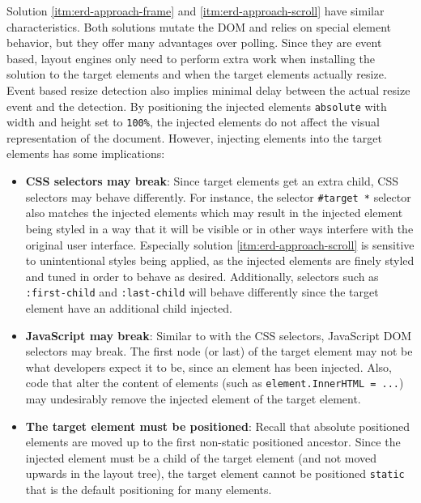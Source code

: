 \documentclass[a4paper,11pt]{kth-mag}
\newcommand{\code}[1]{\texttt{#1}}
\begin{document}
        Solution \ref{itm:erd-approach-frame} and \ref{itm:erd-approach-scroll} have similar characteristics.
        Both solutions mutate the \gls{DOM} and relies on special \gls{element} behavior, but they offer many advantages over polling.
        Since they are event based, layout engines only need to perform extra work when installing the solution to the target \glspl{element} and when the target \glspl{element} actually resize.
        Event based resize detection also implies minimal delay between the actual resize event and the detection.
        By positioning the injected elements \code{absolute} with width and height set to \code{100\%}, the injected \glspl{element} do not affect the visual representation of the \gls{document}.
        However, injecting elements into the target \glspl{element} has some implications:
        \begin{itemize}
          \item \textbf{\gls{CSS} selectors may break}:
            Since target \glspl{element} get an extra child, \gls{CSS} selectors may behave differently.
            For instance, the selector \code{\#target *} selector also matches the injected \glspl{element} which may result in the injected element being styled in a way that it will be visible or in other ways interfere with the original user interface.
            Especially solution \ref{itm:erd-approach-scroll} is sensitive to unintentional styles being applied, as the injected elements are finely styled and tuned in order to behave as desired.
            Additionally, selectors such as \code{:first-child} and \code{:last-child} will behave differently since the target element have an additional child injected.
          \item \textbf{\gls{JavaScript} may break}:
            Similar to with the \gls{CSS} selectors, \gls{JavaScript} \gls{DOM} selectors may break.
            The first node (or last) of the target \gls{element} may not be what developers expect it to be, since an \gls{element} has been injected.
            Also, code that alter the content of \glspl{element} (such as \code{element.InnerHTML = ...}) may undesirably remove the injected \gls{element} of the target element.
          \item \textbf{The target \gls{element} must be positioned}:
            Recall that absolute positioned \glspl{element} are moved up to the first non-static positioned ancestor.
            Since the injected element must be a child of the target \gls{element} (and not moved upwards in the layout tree), the target \gls{element} cannot be positioned \code{static} that is the default positioning for many \glspl{element}.

\end{itemize}
\end{document}
